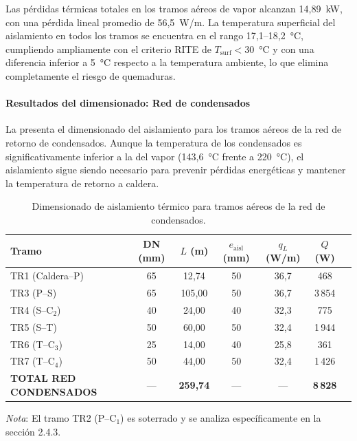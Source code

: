 Las pérdidas térmicas totales en los tramos aéreos de vapor alcanzan 14{,}89~kW, con una pérdida lineal promedio de 56{,}5~W/m. La temperatura superficial del aislamiento en todos los tramos se encuentra en el rango 17{,}1--18{,}2~°C, cumpliendo ampliamente con el criterio RITE de $T_{\text{surf}} < 30$~°C y con una diferencia inferior a 5~°C respecto a la temperatura ambiente, lo que elimina completamente el riesgo de quemaduras.

\paragraph{Resultados del dimensionado: Red de condensados}
\label{par:resultados_cond_aereo}

La  presenta el dimensionado del aislamiento para los tramos aéreos de la red de retorno de condensados. Aunque la temperatura de los condensados es significativamente inferior a la del vapor (143{,}6~°C frente a 220~°C), el aislamiento sigue siendo necesario para prevenir pérdidas energéticas y mantener la temperatura de retorno a caldera.

\begin{table}[htbp]
	\centering
	\caption{Dimensionado de aislamiento térmico para tramos aéreos de la red de condensados.}
	\label{tab:aislamiento_cond_aereo}
	\begin{tabular}{lcccccc}
		\toprule
		\textbf{Tramo}                 & \textbf{DN (mm)} & \textbf{$L$ (m)}  & \textbf{$e_{\text{aisl}}$ (mm)} & \textbf{$q_L$ (W/m)} & \textbf{$Q$ (W)} \\
		\midrule
		TR1 (Caldera--P)               & 65               & 12{,}74           & 50                              & 36{,}7               & 468              \\
		TR3 (P--S)                     & 65               & 105{,}00          & 50                              & 36{,}7               & 3\,854           \\
		TR4 (S--C$_2$)                 & 40               & 24{,}00           & 40                              & 32{,}3               & 775              \\
		TR5 (S--T)                     & 50               & 60{,}00           & 50                              & 32{,}4               & 1\,944           \\
		TR6 (T--C$_3$)                 & 25               & 14{,}00           & 40                              & 25{,}8               & 361              \\
		TR7 (T--C$_4$)                 & 50               & 44{,}00           & 50                              & 32{,}4               & 1\,426           \\
		\midrule
		\textbf{TOTAL RED CONDENSADOS} & ---              & \textbf{259{,}74} & ---                             & ---                  & \textbf{8\,828}  \\
		\bottomrule
	\end{tabular}
	\vspace{0.3cm}

	\noindent \small \textit{Nota}: El tramo TR2 (P--C$_1$) es soterrado y se analiza específicamente en la sección 2.4.3.
\end{table}

